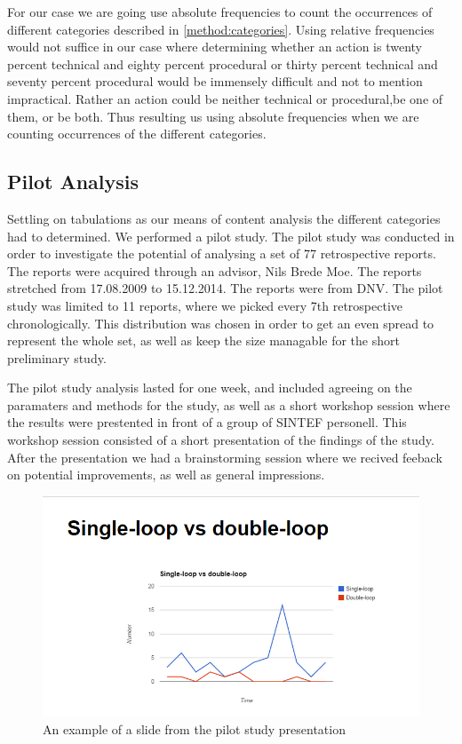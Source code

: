 For our case we are going use absolute frequencies to count the occurrences of different categories described in \autoref{method:categories}. Using relative frequencies would not suffice in our case where determining whether an action is twenty percent technical and eighty percent procedural or thirty percent technical and seventy percent procedural would be immensely difficult and not to mention impractical. Rather an action could be neither technical or procedural,be one of them, or be both. Thus resulting us using absolute frequencies when we are counting occurrences of the different categories.

\subsection{Pilot Analysis}
Settling on tabulations as our means of content analysis the different categories had to determined. We performed a pilot study.
 The pilot study was conducted in order to investigate the potential of analysing a set of 77 retrospective reports. The reports were acquired through an advisor, Nils Brede Moe. The reports stretched from 17.08.2009 to 15.12.2014. The reports were from DNV. The pilot study was limited to 11 reports, where we picked every 7th retrospective chronologically. This distribution was chosen in order to get an even spread to represent the whole set, as well as keep the size managable for the  short preliminary study.

The pilot study analysis lasted for one week, and included agreeing on the paramaters and methods for the study, as well as a short workshop session where the results were prestented in front of a group of SINTEF personell. This workshop session consisted of a short presentation of the findings of the study. After the presentation we had a brainstorming session where we recived feeback on potential improvements, as well as general impressions. 


\begin{figure}[h!]
	\centering
	\includegraphics[width=\textwidth]{figures/Pilot_loop.PNG}
	\caption{An example of a slide from the pilot study presentation }
	\label{figure:Pilot Slide}
\end{figure}
